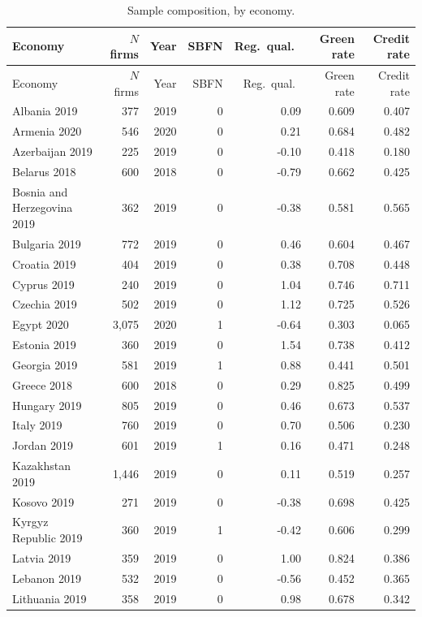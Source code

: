 \documentclass[12pt]{article}
\begin{document}
{\footnotesize
\begin{longtable}{p{3.4cm}rrrrrr}
\caption{Sample composition, by economy.} \label{tab:s-composition} \\
\toprule
Economy & $N$ firms & Year & SBFN & Reg.\ qual.\ & Green rate & Credit rate \\
\midrule
\endfirsthead
\toprule
Economy & $N$ firms & Year & SBFN & Reg.\ qual.\ & Green rate & Credit rate \\
\midrule
\endhead
Albania 2019 & 377 & 2019 & 0 & 0.09 & 0.609 & 0.407 \\
Armenia 2020 & 546 & 2020 & 0 & 0.21 & 0.684 & 0.482 \\
Azerbaijan 2019 & 225 & 2019 & 0 & -0.10 & 0.418 & 0.180 \\
Belarus 2018 & 600 & 2018 & 0 & -0.79 & 0.662 & 0.425 \\
Bosnia and Herzegovina 2019 & 362 & 2019 & 0 & -0.38 & 0.581 & 0.565 \\
Bulgaria 2019 & 772 & 2019 & 0 & 0.46 & 0.604 & 0.467 \\
Croatia 2019 & 404 & 2019 & 0 & 0.38 & 0.708 & 0.448 \\
Cyprus 2019 & 240 & 2019 & 0 & 1.04 & 0.746 & 0.711 \\
Czechia 2019 & 502 & 2019 & 0 & 1.12 & 0.725 & 0.526 \\
Egypt 2020 & 3{,}075 & 2020 & 1 & -0.64 & 0.303 & 0.065 \\
Estonia 2019 & 360 & 2019 & 0 & 1.54 & 0.738 & 0.412 \\
Georgia 2019 & 581 & 2019 & 1 & 0.88 & 0.441 & 0.501 \\
Greece 2018 & 600 & 2018 & 0 & 0.29 & 0.825 & 0.499 \\
Hungary 2019 & 805 & 2019 & 0 & 0.46 & 0.673 & 0.537 \\
Italy 2019 & 760 & 2019 & 0 & 0.70 & 0.506 & 0.230 \\
Jordan 2019 & 601 & 2019 & 1 & 0.16 & 0.471 & 0.248 \\
Kazakhstan 2019 & 1{,}446 & 2019 & 0 & 0.11 & 0.519 & 0.257 \\
Kosovo 2019 & 271 & 2019 & 0 & -0.38 & 0.698 & 0.425 \\
Kyrgyz Republic 2019 & 360 & 2019 & 1 & -0.42 & 0.606 & 0.299 \\
Latvia 2019 & 359 & 2019 & 0 & 1.00 & 0.824 & 0.386 \\
Lebanon 2019 & 532 & 2019 & 0 & -0.56 & 0.452 & 0.365 \\
Lithuania 2019 & 358 & 2019 & 0 & 0.98 & 0.678 & 0.342 \\

\end{longtable}}
\end{document}
